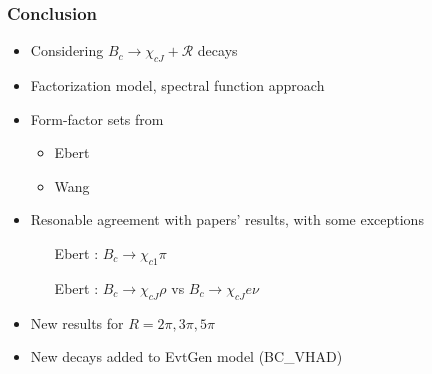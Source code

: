 \documentclass{beamer}
\newcommand{\R}{\mathcal{R}}
\begin{document}
\begin{frame}
  \frametitle{Conclusion}
  \begin{itemize}
  \item Considering $B_c \to \chi_{cJ}+\R$ decays
  \item Factorization model, spectral function approach
  \item Form-factor sets from
    \begin{itemize}
    \item Ebert
    \item Wang
    \end{itemize}
  \item Resonable agreement with papers' results, with some exceptions
    \begin{itemize}
    \item [Ebert]: $B_c\to\chi_{c1}\pi$
    \item [Ebert]: $B_c\to \chi_{cJ}\rho$ vs $B_c\to\chi_{cJ}e\nu$
    \end{itemize}
  \item New results for $R=2\pi, 3\pi, 5\pi$
  \item New decays added to EvtGen model (BC\_VHAD)
  \end{itemize}
\end{frame}
\end{document}
